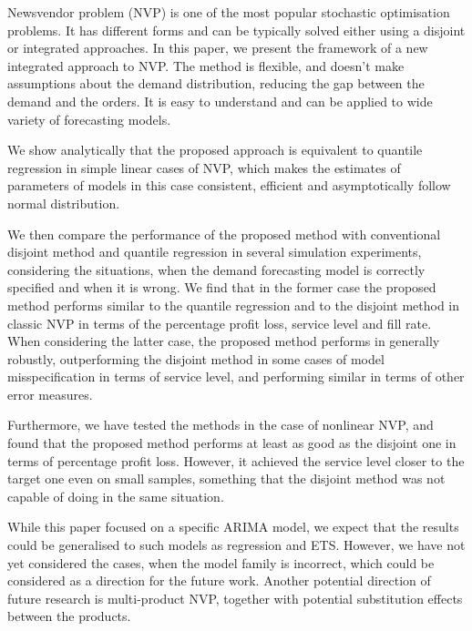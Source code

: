 \documentclass{article}
\begin{document}
Newsvendor problem (NVP) is one of the most popular stochastic optimisation problems. It has different forms and can be typically solved either using a disjoint or integrated approaches. In this paper, we present the framework of a new integrated approach to NVP. The method is flexible, and doesn't make assumptions about the demand distribution, reducing the gap between the demand and the orders.%
It is easy to understand and can be applied to wide variety of forecasting models.

We show analytically that the proposed approach is equivalent to quantile regression in simple linear cases of NVP, which makes the estimates of parameters of models in this case consistent, efficient and asymptotically follow normal distribution.

We then compare the performance of the proposed method with conventional disjoint method and quantile regression in several simulation experiments, considering the situations, when the demand forecasting model is correctly specified and when it is wrong. We find that in the former case the proposed method performs similar to the quantile regression and to the disjoint method in classic NVP in terms of the percentage profit loss, service level and fill rate. When considering the latter case, the proposed method performs in generally robustly, outperforming the disjoint method in some cases of model misspecification in terms of service level, and performing similar in terms of other error measures.

Furthermore, we have tested the methods in the case of nonlinear NVP, and found that the proposed method performs at least as good as the disjoint one in terms of percentage profit loss. However, it achieved the service level closer to the target one even on small samples, something that the disjoint method was not capable of doing in the same situation.

While this paper focused on a specific ARIMA model, we expect that the results could be generalised to such models as regression and ETS. However, we have not yet considered the cases, when the model family is incorrect, which could be considered as a direction for the future work. Another potential direction of future research is multi-product NVP, together with potential substitution effects between the products.

\printbibliography
\end{document}
